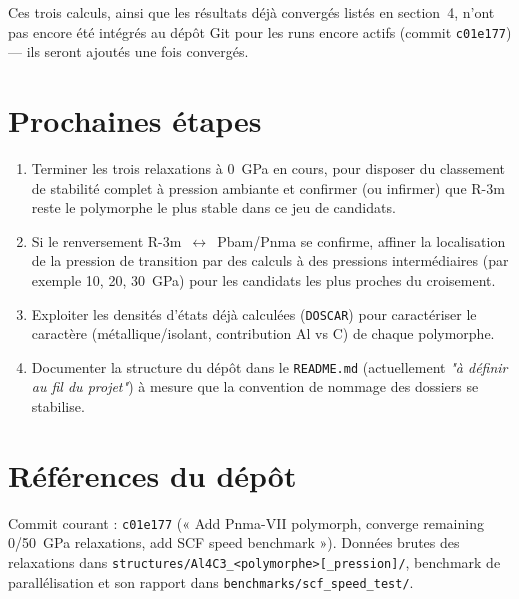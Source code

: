 \documentclass[11pt,a4paper]{article}
\begin{document}
Ces trois calculs, ainsi que les résultats déjà convergés listés en section~4, n'ont pas
encore été intégrés au dépôt Git pour les runs encore actifs (commit \texttt{c01e177}) — ils
seront ajoutés une fois convergés.

\section{Prochaines étapes}

\begin{enumerate}[label=(\roman*)]
  \item Terminer les trois relaxations à 0~GPa en cours, pour disposer du classement de
  stabilité complet à pression ambiante et confirmer (ou infirmer) que R-3m reste le
  polymorphe le plus stable dans ce jeu de candidats.
  \item Si le renversement R-3m~$\leftrightarrow$~Pbam/Pnma se confirme, affiner la
  localisation de la pression de transition par des calculs à des pressions intermédiaires
  (par exemple 10, 20, 30~GPa) pour les candidats les plus proches du croisement.
  \item Exploiter les densités d'états déjà calculées (\texttt{DOSCAR}) pour caractériser le
  caractère (métallique/isolant, contribution Al vs C) de chaque polymorphe.
  \item Documenter la structure du dépôt dans le \texttt{README.md} (actuellement
  \emph{"à définir au fil du projet"}) à mesure que la convention de nommage des dossiers se
  stabilise.
\end{enumerate}

\appendix
\section{Références du dépôt}

Commit courant : \texttt{c01e177} (« Add Pnma-VII polymorph, converge remaining 0/50~GPa
relaxations, add SCF speed benchmark »). Données brutes des relaxations dans
\texttt{structures/Al4C3\_<polymorphe>[\_pression]/}, benchmark de parallélisation et son
rapport dans \texttt{benchmarks/scf\_speed\_test/}.
\end{document}

